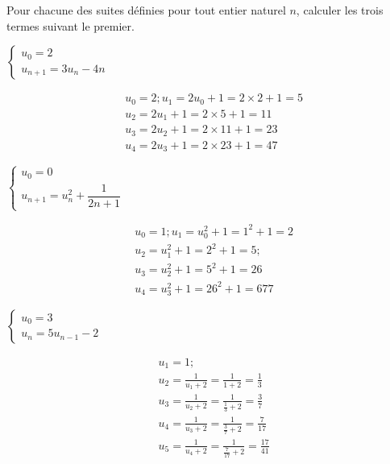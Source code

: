 \documentclass[11pt,a4paper]{article}  %
\begin{document}

Pour chacune des suites définies pour tout entier naturel $n$, calculer les trois termes suivant le premier.
	\begin{enumMet}
		\item $\left\{\begin{array}{l}u_0=2 \\ u_{n+1}=3 u_n-4 n\end{array}\right.$
		\begin{corrBox}
			$$\begin{aligned}
				& u_0=2 ; u_1=2 u_0+1=2 \times 2+1=5 \\
				& u_2=2 u_1+1=2 \times 5+1=11 \\
				& u_3=2 u_2+1=2 \times 11+1=23 \\
				& u_4=2 u_3+1=2 \times 23+1=47
			\end{aligned}$$		
		\end{corrBox}
		\item $\left\{\begin{array}{l}u_0=0 \\ u_{n+1}=u_n^2+\dfrac{1}{2 n+1}\end{array}\right.$
		\begin{corrBox}
			$$
			\begin{aligned}
				& u_0=1 ; u_1=u_0^2+1=1^2+1=2 \\
				& u_2=u_1^2+1=2^2+1=5 ; \\
				& u_3=u_2^2+1=5^2+1=26 \\
				& u_4=u_3^2+1=26^2+1=677
			\end{aligned}
			$$		
		\end{corrBox}
		\item $\left\{\begin{array}{l}u_0=3 \\ u_n=5 u_{n-1}-2\end{array}\right.$
		\begin{corrBox}
			$$\begin{aligned}
				& u_1 =1 ; \\
				& u_2  =\frac{1}{u_1+2}=\frac{1}{1+2}=\frac{1}{3} \\
				&u_3 = \frac{1}{u_2+2} =\frac{1}{\frac{1}{3}+2}=\frac{3}{7}\\ 
				& u_4=\frac{1}{u_3+2}=\frac{1}{\frac{3}{7}+2}=\frac{7}{17} \\
				& u_5 =\frac{1}{u_4+2}=\frac{1}{\frac{7}{17}+2}=\frac{17}{41}
			\end{aligned}$$		

\end{corrBox}
\end{enumMet}
\end{document}
